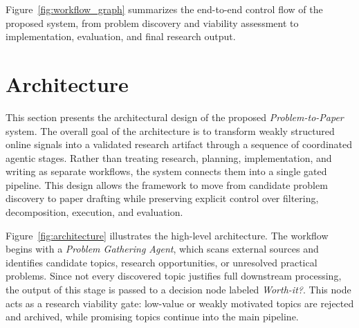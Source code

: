 \documentclass[11pt,a4paper]{article}
\begin{document}
Figure~\ref{fig:workflow_graph} summarizes the end-to-end control flow of the proposed system, from problem discovery and viability assessment to implementation, evaluation, and final research output.

\section{Architecture}
\label{sec:architecture}

This section presents the architectural design of the proposed \emph{Problem-to-Paper} system. The overall goal of the architecture is to transform weakly structured online signals into a validated research artifact through a sequence of coordinated agentic stages. Rather than treating research, planning, implementation, and writing as separate workflows, the system connects them into a single gated pipeline. This design allows the framework to move from candidate problem discovery to paper drafting while preserving explicit control over filtering, decomposition, execution, and evaluation.

Figure~\ref{fig:architecture} illustrates the high-level architecture. The workflow begins with a \emph{Problem Gathering Agent}, which scans external sources and identifies candidate topics, research opportunities, or unresolved practical problems. Since not every discovered topic justifies full downstream processing, the output of this stage is passed to a decision node labeled \emph{Worth-it?}. This node acts as a research viability gate: low-value or weakly motivated topics are rejected and archived, while promising topics continue into the main pipeline.
\end{document}
